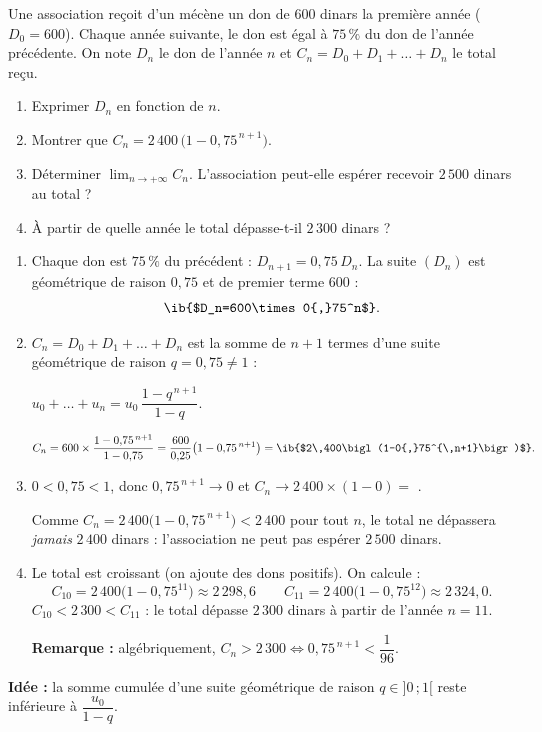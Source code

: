 
Une association reçoit d'un mécène un don de $600$ dinars la première année ($D_0=600$). Chaque année suivante, le don est égal à $75\,\%$ du don de l'année précédente. On note $D_n$ le don de l'année $n$ et $C_n=D_0+D_1+\dots+D_n$ le total reçu.

\begin{enumerate}
  \item Exprimer $D_n$ en fonction de $n$.
  \item Montrer que $C_n=2\,400\,\bigl(1-0{,}75^{\,n+1}\bigr)$.
  \item Déterminer $\displaystyle\lim_{n\to+\infty}C_n$. L'association peut-elle espérer recevoir $2\,500$ dinars au total ?
  \item À partir de quelle année le total dépasse-t-il $2\,300$ dinars ?
\end{enumerate}

\begin{enumerate}
  \item Chaque don est $75\,\%$ du précédent : $D_{n+1}=0{,}75\,D_n$. La suite $(D_n)$ est géométrique de raison $0{,}75$ et de premier terme $600$ :
  $$ \ib{$D_n=600\times0{,}75^n$}.$$
  \item $C_n=D_0+D_1+\dots+D_n$ est la somme de $n+1$ termes d'une suite géométrique de raison $q=0{,}75\neq1$ :
  \begin{prop}
  $u_0+\dots+u_n=u_0\,\dfrac{1-q^{\,n+1}}{1-q}$.
  \end{prop}
  $$C_n=600\times\frac{1-0{,}75^{\,n+1}}{1-0{,}75}=\frac{600}{0{,}25}\bigl(1-0{,}75^{\,n+1}\bigr)=\ib{$2\,400\bigl(1-0{,}75^{\,n+1}\bigr)$}.$$
  \item $0<0{,}75<1$, donc $0{,}75^{\,n+1}\to0$ et $C_n\to2\,400\times(1-0)=$ .

  Comme $C_n=2\,400\bigl(1-0{,}75^{\,n+1}\bigr)<2\,400$ pour tout $n$, le total ne dépassera \emph{jamais} $2\,400$ dinars : l'association ne peut pas espérer $2\,500$ dinars.
  \item Le total est croissant (on ajoute des dons positifs). On calcule :
  $$C_{10}=2\,400\bigl(1-0{,}75^{11}\bigr)\approx2\,298{,}6\qquad C_{11}=2\,400\bigl(1-0{,}75^{12}\bigr)\approx2\,324{,}0.$$
  $C_{10}<2\,300<C_{11}$ : le total dépasse $2\,300$ dinars à partir de l'année $n=11$.

  \textbf{Remarque :} algébriquement, $C_n>2\,300\iff0{,}75^{\,n+1}<\dfrac1{96}$.
\end{enumerate}

\textbf{Idée :} la somme cumulée d'une suite géométrique de raison $q\in]0\,;1[$ reste inférieure à $\dfrac{u_0}{1-q}$.
